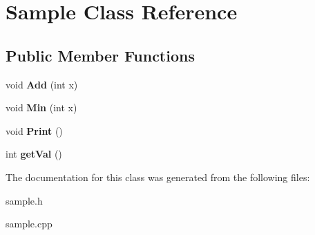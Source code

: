 \hypertarget{class_sample}{}\section{Sample Class Reference}
\label{class_sample}
\subsection*{Public Member Functions}
\begin{DoxyCompactItemize}
\item 
void {\bfseries Add} (int x)\hypertarget{class_sample_aaef14f95b2f52d048de8b0f43519fe35}{}\label{class_sample_aaef14f95b2f52d048de8b0f43519fe35}

\item 
void {\bfseries Min} (int x)\hypertarget{class_sample_ac2f36c7cea143a69151f5db38b8337e9}{}\label{class_sample_ac2f36c7cea143a69151f5db38b8337e9}

\item 
void {\bfseries Print} ()\hypertarget{class_sample_a4fb8a2e8d124ae41c13e7e5abb3dce08}{}\label{class_sample_a4fb8a2e8d124ae41c13e7e5abb3dce08}

\item 
int {\bfseries get\+Val} ()\hypertarget{class_sample_ab25087ebc51588d3cabe557ef516d4d9}{}\label{class_sample_ab25087ebc51588d3cabe557ef516d4d9}

\end{DoxyCompactItemize}


The documentation for this class was generated from the following files\+:\begin{DoxyCompactItemize}
\item 
sample.\+h\item 
sample.\+cpp\end{DoxyCompactItemize}
